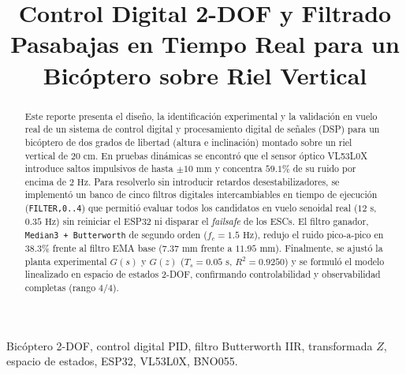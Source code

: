 \documentclass[conference]{IEEEtran}
\begin{document}
\title{Control Digital 2-DOF y Filtrado Pasabajas en Tiempo Real para un Bic\'{o}ptero sobre Riel Vertical}

\author{
}

\maketitle

\begin{abstract}
Este reporte presenta el dise\~{n}o, la identificaci\'{o}n experimental y la validaci\'{o}n en vuelo real de un sistema de control digital y procesamiento digital de se\~{n}ales (DSP) para un bic\'{o}ptero de dos grados de libertad (altura e inclinaci\'{o}n) montado sobre un riel vertical de $20\text{ cm}$. En pruebas din\'{a}micas se encontr\'{o} que el sensor \'{o}ptico VL53L0X introduce saltos impulsivos de hasta $\pm 10\text{ mm}$ y concentra $59.1\%$ de su ruido por encima de $2\text{ Hz}$. Para resolverlo sin introducir retardos desestabilizadores, se implement\'{o} un banco de cinco filtros digitales intercambiables en tiempo de ejecuci\'{o}n (\texttt{FILTER,0..4}) que permiti\'{o} evaluar todos los candidatos en vuelo senoidal real ($12\text{ s}$, $0.35\text{ Hz}$) sin reiniciar el ESP32 ni disparar el \textit{failsafe} de los ESCs. El filtro ganador, \texttt{Median3 + Butterworth} de segundo orden ($f_c = 1.5\text{ Hz}$), redujo el ruido pico-a-pico en $38.3\%$ frente al filtro EMA base ($7.37\text{ mm}$ frente a $11.95\text{ mm}$). Finalmente, se ajust\'{o} la planta experimental $G(s)$ y $G(z)$ ($T_s = 0.05\text{ s}$, $R^2 = 0.9250$) y se formul\'{o} el modelo linealizado en espacio de estados 2-DOF, confirmando controlabilidad y observabilidad completas (rango $4/4$).
\end{abstract}

\begin{IEEEkeywords}
Bic\'{o}ptero 2-DOF, control digital PID, filtro Butterworth IIR, transformada $Z$, espacio de estados, ESP32, VL53L0X, BNO055.
\end{IEEEkeywords}
\end{document}
